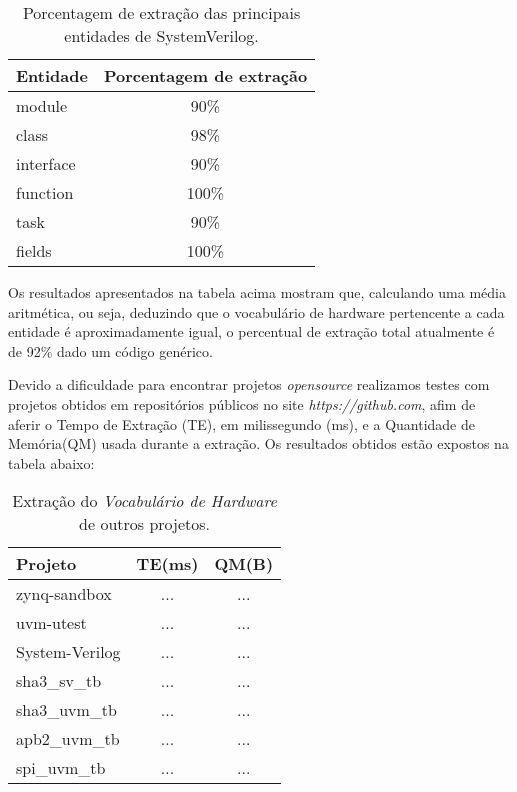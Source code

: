 \documentclass[12pt, twocolumn, a4paper]{article}
\begin{document}
\begin{table}[h]
\centering
\caption{Porcentagem de extração das principais entidades de SystemVerilog.}
	\begin{tabular}{l|c}
	\hline
	Entidade  & Porcentagem de extração\\
	\hline
	module     & 90\% \\
	\hline
	class 	   & 98\% \\
	\hline
	interface  & 90\% \\
	\hline
	function   & 100\% \\
	\hline
	task       & 90\% \\
	\hline
	fields     & 100\% \\
	\hline
	
	\end{tabular}

\end{table}
Os resultados apresentados na tabela acima mostram que, calculando uma média aritmética, ou seja, deduzindo que o vocabulário de hardware pertencente a cada entidade é aproximadamente igual, o percentual de extração total atualmente é de 92\% dado um código genérico.

Devido a dificuldade para encontrar projetos \textit{opensource} realizamos testes com projetos obtidos em repositórios públicos no site \textit{https://github.com}, afim de aferir o Tempo de Extração (TE), em milissegundo (ms), e a Quantidade de Memória(QM) usada durante a extração. Os resultados obtidos estão expostos na tabela abaixo:
	
	\begin{table}[h]
\centering
\caption{Extração do \textit{Vocabulário de Hardware} de outros projetos.}
	\begin{tabular}{l|c|c}
	\hline
	Projeto  & TE(ms) & QM(B)\\
	\hline
	zynq-sandbox     & ... & ...\\
	\hline
	uvm-utest 	   & ... & ...\\
	\hline
	System-Verilog   & ... & ...\\
	\hline
	sha3\_sv\_tb       & ... & ...\\
	\hline
	sha3\_uvm\_tb     & ... & ...\\
	\hline
	apb2\_uvm\_tb   & ... & ...\\
	\hline
	spi\_uvm\_tb       & ... & ...\\
	\hline
	
	\end{tabular}

\end{table}	
	
\end{document}
